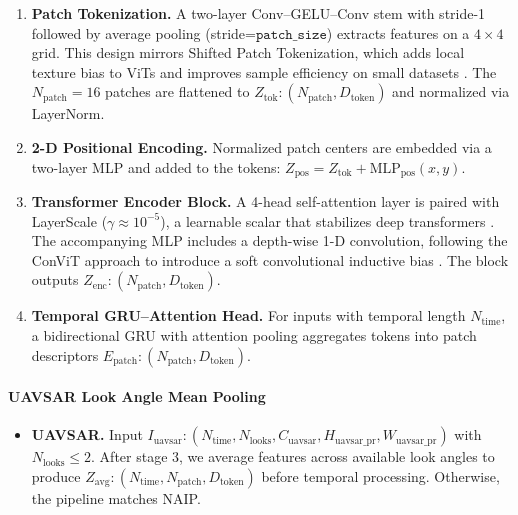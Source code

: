 \documentclass[preprint,12pt,authoryear]{elsarticle}
\begin{document}
\begin{enumerate}[leftmargin=*]      
\item \textbf{Patch Tokenization.}  
      A two-layer Conv–GELU–Conv stem with stride-1 followed by average pooling (stride=$\texttt{patch\_size}$) extracts features on a $4\times4$ grid.  
      This design mirrors Shifted Patch Tokenization, which adds local texture bias to ViTs and improves sample efficiency on small datasets \citep{lee2021vision}.  
      The $N_{\text{patch}}=16$ patches are flattened to $Z_{\text{tok}}: (N_{\text{patch}}, D_{\text{token}})$ and normalized via LayerNorm.


\item \textbf{2-D Positional Encoding.}  
      Normalized patch centers are embedded via a two-layer MLP and added to the tokens:  
      $Z_{\text{pos}} = Z_{\text{tok}} + \text{MLP}_{\text{pos}}(x,y)$.

\item \textbf{Transformer Encoder Block.}  
      A 4-head self-attention layer is paired with LayerScale ($\gamma \approx 10^{-5}$), a learnable scalar that stabilizes deep transformers \citep{touvron2021going}.  
      The accompanying MLP includes a depth-wise 1-D convolution, following the ConViT approach to introduce a soft convolutional inductive bias \citep{dascoli2021convit}.  
      The block outputs $Z_{\text{enc}}: (N_{\text{patch}}, D_{\text{token}})$.


\item \textbf{Temporal GRU–Attention Head.}  
      For inputs with temporal length $N_{\text{time}}$, a bidirectional GRU with attention pooling aggregates tokens into patch descriptors $E_{\text{patch}}: (N_{\text{patch}}, D_{\text{token}})$.
\end{enumerate}

\paragraph{UAVSAR Look Angle Mean Pooling}
\begin{itemize}[leftmargin=*]
\item \textbf{UAVSAR.}  
      Input $I_{\text{uavsar}}: (N_{\text{time}}, N_{\text{looks}}, C_{\text{uavsar}}, H_{\text{uavsar\_pr}}, W_{\text{uavsar\_pr}})$ with $N_{\text{looks}} \leq 2$.  
      After stage 3, we average features across available look angles to produce $Z_{\text{avg}}: (N_{\text{time}}, N_{\text{patch}}, D_{\text{token}})$ before temporal processing.
      Otherwise, the pipeline matches NAIP.
\end{itemize}
\end{document}
